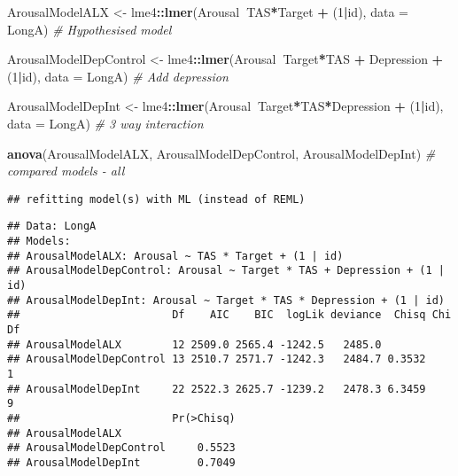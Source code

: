 \documentclass[]{article}
\newenvironment{Shaded}{\begin{snugshade}}{\end{snugshade}}
\newcommand{\CommentTok}[1]{\textcolor[rgb]{0.56,0.35,0.01}{\textit{#1}}}
\newcommand{\DataTypeTok}[1]{\textcolor[rgb]{0.13,0.29,0.53}{#1}}
\newcommand{\DecValTok}[1]{\textcolor[rgb]{0.00,0.00,0.81}{#1}}
\newcommand{\KeywordTok}[1]{\textcolor[rgb]{0.13,0.29,0.53}{\textbf{#1}}}
\newcommand{\NormalTok}[1]{#1}
\newcommand{\OperatorTok}[1]{\textcolor[rgb]{0.81,0.36,0.00}{\textbf{#1}}}
\newcommand{\StringTok}[1]{\textcolor[rgb]{0.31,0.60,0.02}{#1}}
\begin{document}
\begin{Shaded}
\begin{Highlighting}[]
\NormalTok{ArousalModelALX <-}\StringTok{ }\NormalTok{lme4}\OperatorTok{::}\KeywordTok{lmer}\NormalTok{(Arousal}\OperatorTok{~}\NormalTok{TAS}\OperatorTok{*}\NormalTok{Target }\OperatorTok{+}\StringTok{ }\NormalTok{(}\DecValTok{1}\OperatorTok{|}\NormalTok{id), }\DataTypeTok{data =}\NormalTok{ LongA) }\CommentTok{# Hypothesised model }

\NormalTok{ArousalModelDepControl <-}\StringTok{ }\NormalTok{lme4}\OperatorTok{::}\KeywordTok{lmer}\NormalTok{(Arousal}\OperatorTok{~}\NormalTok{Target}\OperatorTok{*}\NormalTok{TAS }\OperatorTok{+}\StringTok{ }\NormalTok{Depression }\OperatorTok{+}\StringTok{ }\NormalTok{(}\DecValTok{1}\OperatorTok{|}\NormalTok{id), }\DataTypeTok{data =}\NormalTok{ LongA) }\CommentTok{# Add depression}

\NormalTok{ArousalModelDepInt <-}\StringTok{ }\NormalTok{lme4}\OperatorTok{::}\KeywordTok{lmer}\NormalTok{(Arousal}\OperatorTok{~}\NormalTok{Target}\OperatorTok{*}\NormalTok{TAS}\OperatorTok{*}\NormalTok{Depression }\OperatorTok{+}\StringTok{ }\NormalTok{(}\DecValTok{1}\OperatorTok{|}\NormalTok{id), }\DataTypeTok{data =}\NormalTok{ LongA) }\CommentTok{# 3 way interaction }

\KeywordTok{anova}\NormalTok{(ArousalModelALX, ArousalModelDepControl, ArousalModelDepInt) }\CommentTok{# compared models - all }
\end{Highlighting}
\end{Shaded}

\begin{verbatim}
## refitting model(s) with ML (instead of REML)
\end{verbatim}

\begin{verbatim}
## Data: LongA
## Models:
## ArousalModelALX: Arousal ~ TAS * Target + (1 | id)
## ArousalModelDepControl: Arousal ~ Target * TAS + Depression + (1 | id)
## ArousalModelDepInt: Arousal ~ Target * TAS * Depression + (1 | id)
##                        Df    AIC    BIC  logLik deviance  Chisq Chi Df
## ArousalModelALX        12 2509.0 2565.4 -1242.5   2485.0              
## ArousalModelDepControl 13 2510.7 2571.7 -1242.3   2484.7 0.3532      1
## ArousalModelDepInt     22 2522.3 2625.7 -1239.2   2478.3 6.3459      9
##                        Pr(>Chisq)
## ArousalModelALX                  
## ArousalModelDepControl     0.5523
## ArousalModelDepInt         0.7049
\end{verbatim}
\end{document}
